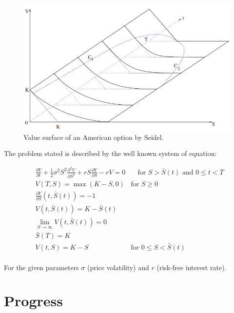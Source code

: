 \documentclass[a4paper,12pt]{article}
\begin{document}
  \begin{figure}[H]
    \centering
    \includegraphics[scale=0.7]{progress_report/American_put_option.png}
    \caption{Value surface of an American option by Seidel\cite{seydel_2009}.}
    \label{fig:value_surface}
  \end{figure}

  The problem stated is described by the well known system of equation:

  \begin{equation}
    \begin{aligned}
      & \frac{\partial V}{\partial t} + \frac{1}{2}\sigma^2 S^2 \frac{\partial^2 V}{\partial S^2} + rS \frac{\partial V}{\partial S} - rV = 0 & \quad \text{for $S > \bar{S}(t)$ and $0 \leq t < T$} \\
      & V(T, S) = \max(K - S, 0) & \text{for $S \geq 0$} \\
      & \frac{\partial V}{\partial S}(t, \bar{S}(t)) = -1 \\
      & V(t, \bar{S}(t)) = K - \bar{S}(t) \\
      & \lim_{S \rightarrow \infty} V(t, \bar{S}(t)) = 0 \\
      & \bar{S}(T) = K \\
      & V(t, S) = K - S & \text{for $0 \leq S < \bar{S}(t)$} \\
    \end{aligned}   
    \label{eq:section_1:free_boundary_problem}
  \end{equation}

  For the given parameters $\sigma$ (price volatility) 
  and $r$ (risk-free interest rate).
  
  \section{Progress}
\end{document}
